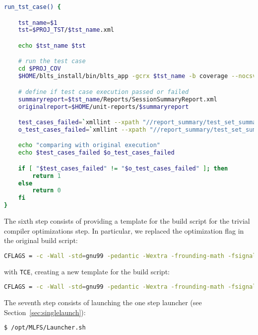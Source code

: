 \begin{lstlisting}[language=bash, label=mutation_additional, caption='run\_tst\_case' Bash function for the MLFS. Excerpt of mutation\_additional\_functions.sh file.]
run_tst_case() {

    tst_name=$1
    tst=$PROJ_TST/$tst_name.xml

    echo $tst_name $tst

    # run the test case
    cd $PROJ_COV
    $HOME/blts_install/bin/blts_app -gcrx $tst_name -b coverage --nocsv -s $tst

    # define if test case execution passed or failed
    summaryreport=$tst_name/Reports/SessionSummaryReport.xml
    originalreport=$HOME/unit-reports/$summaryreport

    test_cases_failed=`xmllint --xpath "//report_summary/test_set_summary/test_cases_failed/text()" $summaryreport`
    o_test_cases_failed=`xmllint --xpath "//report_summary/test_set_summary/test_cases_failed/text()" $originalreport`

    echo "comparing with original execution"
    echo $test_cases_failed $o_test_cases_failed

    if [ "$test_cases_failed" != "$o_test_cases_failed" ]; then
        return 1
    else
        return 0
    fi
}
\end{lstlisting}

The sixth step consists of providing a template for the build script for the trivial compiler optimizations step. In particular, we replaced the optimization flag in the original build script:

\begin{lstlisting}[language=bash, caption=Excerpt from Makefile.]
CFLAGS = -c -Wall -std=gnu99 -pedantic -Wextra -frounding-math -fsignaling-nans -g O2 -fno-builtin $(EXTRA_CFLAGS)
\end{lstlisting}

with \texttt{TCE}, creating a new template for the build script:

\begin{lstlisting}[language=bash, caption=Excerpt from Makefile.template.]
CFLAGS = -c -Wall -std=gnu99 -pedantic -Wextra -frounding-math -fsignaling-nans TCE -fno-builtin $(EXTRA_CFLAGS)
\end{lstlisting}

The seventh step consists of launching the one step launcher (see Section~\ref{sec:singlelaunch}):

\begin{lstlisting}[language=bash]
 $ /opt/MLFS/Launcher.sh
\end{lstlisting}

